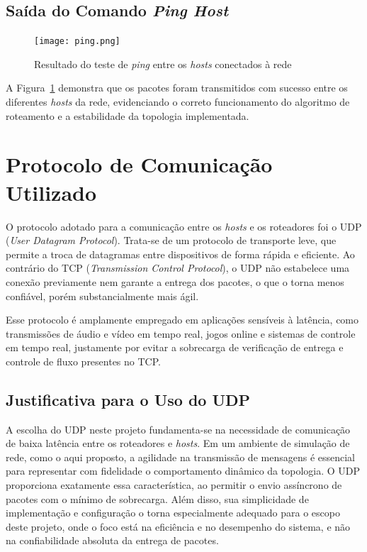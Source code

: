 \documentclass[12pt,a4paper]{report}
\begin{document}
\subsection{Saída do Comando \textit{Ping Host}}

\begin{figure}[h!]
    \centering
    \texttt{[image: ping.png]}
    \caption{Resultado do teste de \textit{ping} entre os \textit{hosts} conectados à rede}
    \label{fig:ping}
\end{figure}

A Figura~\ref{fig:ping} demonstra que os pacotes foram transmitidos com sucesso entre os diferentes \textit{hosts} da rede, evidenciando o correto funcionamento do algoritmo de roteamento e a estabilidade da topologia implementada.

\section{Protocolo de Comunicação Utilizado}

O protocolo adotado para a comunicação entre os \textit{hosts} e os roteadores foi o UDP (\textit{User Datagram Protocol}). Trata-se de um protocolo de transporte leve, que permite a troca de datagramas entre dispositivos de forma rápida e eficiente. Ao contrário do TCP (\textit{Transmission Control Protocol}), o UDP não estabelece uma conexão previamente nem garante a entrega dos pacotes, o que o torna menos confiável, porém substancialmente mais ágil.

Esse protocolo é amplamente empregado em aplicações sensíveis à latência, como transmissões de áudio e vídeo em tempo real, jogos online e sistemas de controle em tempo real, justamente por evitar a sobrecarga de verificação de entrega e controle de fluxo presentes no TCP.

\subsection*{Justificativa para o Uso do UDP}

A escolha do UDP neste projeto fundamenta-se na necessidade de comunicação de baixa latência entre os roteadores e \textit{hosts}. Em um ambiente de simulação de rede, como o aqui proposto, a agilidade na transmissão de mensagens é essencial para representar com fidelidade o comportamento dinâmico da topologia. O UDP proporciona exatamente essa característica, ao permitir o envio assíncrono de pacotes com o mínimo de sobrecarga. Além disso, sua simplicidade de implementação e configuração o torna especialmente adequado para o escopo deste projeto, onde o foco está na eficiência e no desempenho do sistema, e não na confiabilidade absoluta da entrega de pacotes.



\end{document}
